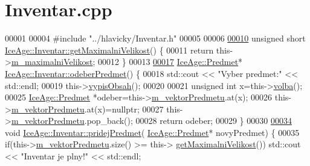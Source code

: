 \hypertarget{Inventar_8cpp_source}{}\section{Inventar.\+cpp}
\label{Inventar_8cpp_source}

\begin{DoxyCode}
00001 
00004 \textcolor{preprocessor}{#include "../hlavicky/Inventar.h"}
00005 
00006 
\hypertarget{Inventar_8cpp_source.tex_l00010}{}\hyperlink{classIceAge_1_1Inventar_a8a8f2cf0fd978a5828b640c24db95e34}{00010} \textcolor{keywordtype}{unsigned} \textcolor{keywordtype}{short} \hyperlink{classIceAge_1_1Inventar_a8a8f2cf0fd978a5828b640c24db95e34}{IceAge::Inventar::getMaximalniVelikost}() \{
00011     \textcolor{keywordflow}{return} this->\hyperlink{classIceAge_1_1Inventar_ad45fb3c8b53eb431f3e212e5951b4623}{m\_maximalniVelikost};
00012 \}
00013 
\hypertarget{Inventar_8cpp_source.tex_l00017}{}\hyperlink{classIceAge_1_1Inventar_a3762d1e00c50d07ee89aaa97f7e37ffe}{00017} \hyperlink{classIceAge_1_1Predmet}{IceAge::Predmet}* \hyperlink{classIceAge_1_1Inventar_a3762d1e00c50d07ee89aaa97f7e37ffe}{IceAge::Inventar::odeberPredmet}() \{
00018     std::cout << \textcolor{stringliteral}{"Vyber predmet:"} << std::endl;
00019     this->\hyperlink{classIceAge_1_1Inventar_a6706fcc99f644cea6c38a7e3126a6892}{vypisObsah}();
00020 
00021     \textcolor{keywordtype}{unsigned} \textcolor{keywordtype}{int} x=this->\hyperlink{classIceAge_1_1Inventar_a2598e120dd0cba29a7d9e70dc29495e8}{volba}();
00025     \hyperlink{classIceAge_1_1Predmet}{IceAge::Predmet} *odeber=this->\hyperlink{classIceAge_1_1Inventar_a0cceae841e70c3db31b3331d4eb075ba}{m\_vektorPredmetu}.at(x);
00026     this->\hyperlink{classIceAge_1_1Inventar_a0cceae841e70c3db31b3331d4eb075ba}{m\_vektorPredmetu}.at(x)=\textcolor{keyword}{nullptr};
00027     this->\hyperlink{classIceAge_1_1Inventar_a0cceae841e70c3db31b3331d4eb075ba}{m\_vektorPredmetu}.pop\_back();
00028     \textcolor{keywordflow}{return} odeber;
00029 \}
00030 
\hypertarget{Inventar_8cpp_source.tex_l00034}{}\hyperlink{classIceAge_1_1Inventar_a09802bba103ef43221b08f24f651b0c9}{00034} \textcolor{keywordtype}{void} \hyperlink{classIceAge_1_1Inventar_a09802bba103ef43221b08f24f651b0c9}{IceAge::Inventar::pridejPredmet}(
      \hyperlink{classIceAge_1_1Predmet}{IceAge::Predmet}* novyPredmet) \{
00035     \textcolor{keywordflow}{if}(this->\hyperlink{classIceAge_1_1Inventar_a0cceae841e70c3db31b3331d4eb075ba}{m\_vektorPredmetu}.size() >= this->
      \hyperlink{classIceAge_1_1Inventar_a8a8f2cf0fd978a5828b640c24db95e34}{getMaximalniVelikost}()) std::cout << \textcolor{stringliteral}{"Inventar je plny!"} << std::endl;

\end{DoxyCode}
